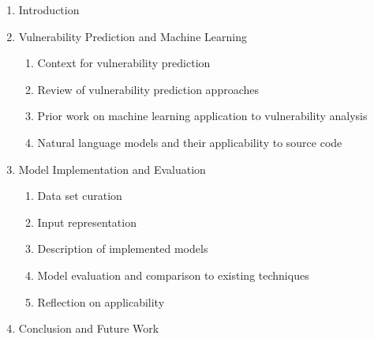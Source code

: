 \documentclass[proposal]{softeng}
\begin{document}
\begin{enumerate}\raggedright
\item Introduction
\item Vulnerability Prediction and Machine Learning
    \begin{enumerate}
    \item Context for vulnerability prediction
    \item Review of vulnerability prediction approaches
    \item Prior work on machine learning application to vulnerability analysis
    \item Natural language models and their applicability to source code
    \end{enumerate}
\item Model Implementation and Evaluation
    \begin{enumerate}
    \item Data set curation
    \item Input representation
    \item Description of implemented models
    \item Model evaluation and comparison to existing techniques
    \item Reflection on applicability
    \end{enumerate}
\item Conclusion and Future Work
\end{enumerate}



\end{document}
